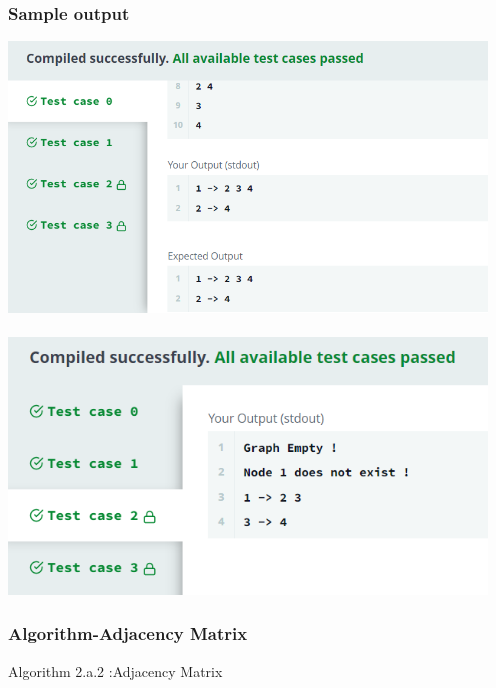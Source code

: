\documentclass[14pt, letterpaper]{article}
\begin{document}
\subsubsection{Sample output}
\includegraphics[width=5in]{images/adlist.png}\\ \\
\includegraphics[width=5in]{images/adlist2.png}
\subsubsection{Algorithm-Adjacency Matrix}
\hline 
\vspace{0.1cm}
\hspace{0.5cm}Algorithm 2.a.2 :Adjacency Matrix
\vspace{0.1cm}
\hline
\end{document}
